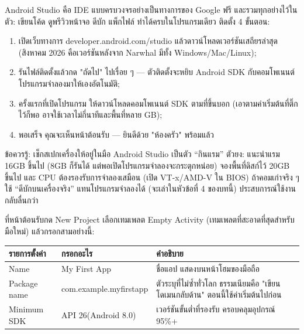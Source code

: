 


Android Studio คือ IDE แบบครบวงจรอย่างเป็นทางการของ Google ฟรี และรวมทุกอย่างไว้ในตัว: เขียนโค้ด ดูพรีวิวหน้าจอ ดีบัก แพ็กไฟล์ ทำได้ครบในโปรแกรมเดียว ติดตั้ง 4 ขั้นตอน:

\begin{enumerate}
  \item เปิดเว็บทางการ developer.android.com/studio แล้วดาวน์โหลดเวอร์ชันเสถียรล่าสุด (สิงหาคม 2026 คือเวอร์ชันหลังจาก Narwhal มีทั้ง Windows/Mac/Linux);
  \item รันไฟล์ติดตั้งแล้วกด "ถัดไป" ไปเรื่อย ๆ — ตัวติดตั้งจะหยิบ Android SDK กับคอมโพเนนต์โปรแกรมจำลองมาให้เองอัตโนมัติ;
  \item ครั้งแรกที่เปิดโปรแกรม ให้ดาวน์โหลดคอมโพเนนต์ SDK ตามที่ขึ้นบอก (เอาตามค่าเริ่มต้นที่ติ๊กไว้ก็พอ อาจใช้เวลาไม่กี่นาทีและพื้นที่หลาย GB);
  \item พอเสร็จ คุณจะเห็นหน้าต้อนรับ — ยินดีด้วย "ห้องครัว" พร้อมแล้ว
\end{enumerate}

\begin{tcbwarn}{ข้อควรรู้: เช็กสเปกเครื่องให้อยู่ในมือ}
Android Studio เป็นตัว “กินแรม” ตัวยง: แนะนำแรม 16GB ขึ้นไป (8GB ก็รันได้ แต่พอเปิดโปรแกรมจำลองจะกระตุกหน่อย) จองพื้นที่ดิสก์ไว้ 20GB ขึ้นไป และ CPU ต้องรองรับการจำลองเสมือน (เปิด VT-x/AMD-V ใน BIOS) ถ้าคอมเก่าจริง ๆ ใช้ “ดีบักบนเครื่องจริง” แทนโปรแกรมจำลองได้ (จะเล่าในหัวข้อที่ 4 ของบทนี้) ประสบการณ์ใช้งานกลับลื่นกว่า

\end{tcbwarn}


ที่หน้าต้อนรับกด New Project เลือกเทมเพลต Empty Activity (เทมเพลตที่สะอาดที่สุดสำหรับมือใหม่) แล้วกรอกสามอย่างนี้:

\begin{center}
\begin{tabularx}{\linewidth}{|X|X|X|}
\hline
\textbf{รายการตั้งค่า} & \textbf{กรอกอะไร} & \textbf{คำอธิบาย} \tabularnewline
\hline
Name & My First App & ชื่อแอป แสดงบนหน้าโฮมของมือถือ \tabularnewline
Package name & com.example.myfirstapp & ตัวระบุที่ไม่ซ้ำทั่วโลก ธรรมเนียมคือ "เขียนโดเมนกลับด้าน" ตอนนี้ใช้ค่าเริ่มต้นไปก่อน \tabularnewline
Minimum SDK & API 26(Android 8.0) & เวอร์ชันขั้นต่ำที่รองรับ ครอบคลุมอุปกรณ์ 95\%+ \tabularnewline
\hline
\end{tabularx}
\end{center}

